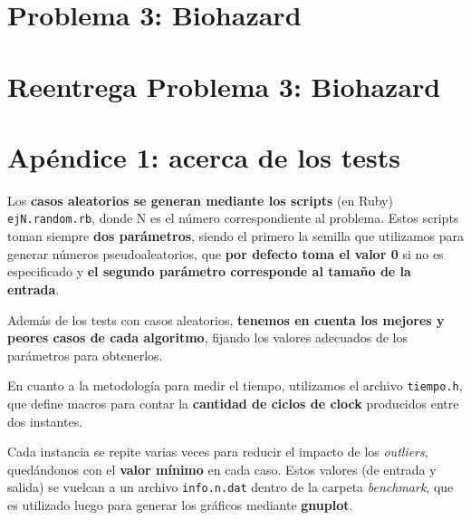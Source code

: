 \documentclass[a4paper]{article}
\begin{document}

%


%

\newpage

\section{Problema 3: Biohazard}


\newpage

\section{Reentrega Problema 3: Biohazard}


\newpage

\section{Apéndice 1: acerca de los tests}
Los \textbf{casos aleatorios se generan mediante los scripts} (en Ruby) \verb|ejN.random.rb|, donde
N es el número correspondiente al problema. Estos scripts toman siempre \textbf{dos parámetros},
siendo el primero la semilla que utilizamos para generar números pseudoaleatorios, que
\textbf{por defecto toma el valor 0} si no es especificado y \textbf{el segundo parámetro corresponde
al tamaño de la entrada}.

Además de los tests con casos aleatorios, \textbf{tenemos en cuenta los mejores y peores
casos de cada algoritmo}, fijando los valores adecuados de los parámetros para
obtenerlos. \medskip

En cuanto a la metodología para medir el tiempo, utilizamos el archivo \verb|tiempo.h|,
que define macros para contar la \textbf{cantidad de ciclos de clock} producidos entre dos instantes. \medskip

Cada instancia se repite varias veces para reducir el impacto de los \textit{outliers}, quedándonos
con el \textbf{valor mínimo} en cada caso. Estos valores (de entrada y salida) se vuelcan a un archivo
\verb|info.n.dat| dentro de la carpeta \textit{benchmark}, que es utilizado luego para generar los gráficos
mediante \textbf{gnuplot}. \medskip
\end{document}
